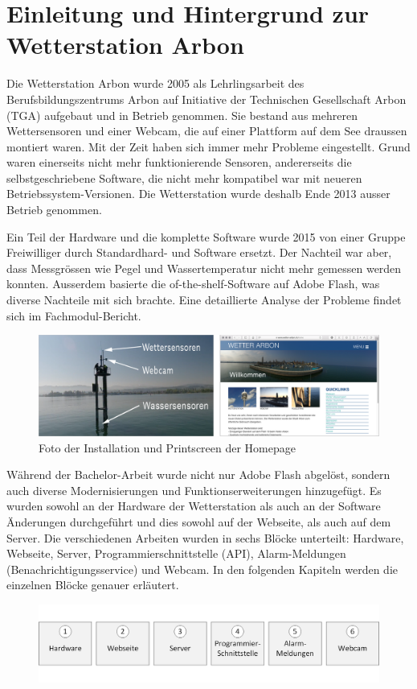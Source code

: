 \section*{Einleitung und Hintergrund zur Wetterstation Arbon}

Die Wetterstation Arbon wurde 2005 als Lehrlingsarbeit des Berufsbildungszentrums Arbon auf Initiative der Technischen Gesellschaft Arbon (TGA) aufgebaut und in Betrieb genommen. Sie bestand aus mehreren Wettersensoren und einer Webcam, die auf einer Plattform auf dem See draussen montiert waren. Mit der Zeit haben sich immer mehr Probleme eingestellt. Grund waren einerseits nicht mehr funktionierende Sensoren, andererseits die selbstgeschriebene Software, die nicht mehr kompatibel war mit neueren Betriebssystem-Versionen. Die Wetterstation wurde deshalb Ende 2013 ausser Betrieb genommen.

Ein Teil der Hardware und die komplette Software wurde 2015 von einer Gruppe Freiwilliger durch Standardhard- und Software ersetzt. Der Nachteil war aber, dass Messgrössen wie Pegel und Wassertemperatur nicht mehr gemessen werden konnten. Ausserdem basierte die of-the-shelf-Software auf Adobe Flash, was diverse Nachteile mit sich brachte. Eine detaillierte Analyse der Probleme findet sich im Fachmodul-Bericht\cite{BilWie2018MUIu}.

\begin{figure}[htbp!]
	\centering
	\includegraphics[width=1\linewidth]{img/kombi}
	\caption{Foto der Installation und Printscreen der Homepage}
	\label{img:wetterstation}
\end{figure}

\noindent
Während der Bachelor-Arbeit wurde nicht nur Adobe Flash abgelöst, sondern auch diverse Modernisierungen und Funktionserweiterungen hinzugefügt. Es wurden sowohl an der Hardware der Wetterstation als auch an der Software Änderungen durchgeführt und dies sowohl auf der Webseite, als auch auf dem Server. Die verschiedenen Arbeiten wurden in sechs Blöcke unterteilt: Hardware, Webseite, Server, Programmierschnittstelle (API), Alarm-Meldungen (Benachrichtigungsservice) und Webcam. In den folgenden Kapiteln werden die einzelnen Blöcke genauer erläutert.

\begin{figure}[htbp]
	\centering
	\includegraphics[width=\textwidth]{img/module}
	\label{img:module}
\end{figure}
\newpage
